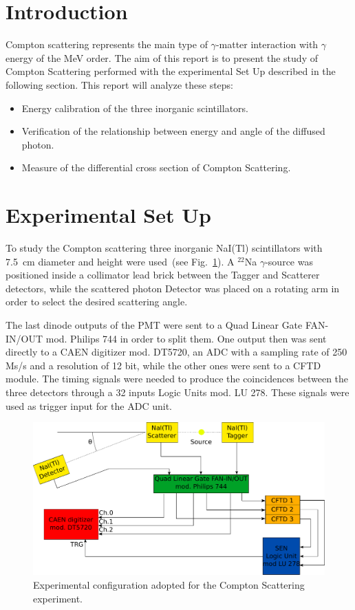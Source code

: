 \section*{Introduction}

Compton scattering represents the main  type of $\gamma$-matter interaction with $\gamma$ energy of the MeV order.   
The aim of this report is to present the study of Compton Scattering performed with the experimental Set Up described in the following section.
This report will analyze these steps:
\begin{itemize}
	\item Energy calibration of the three inorganic scintillators.
	\item Verification of the relationship between energy and angle of the diffused photon.
	\item Measure of the differential cross section of Compton Scattering.
\end{itemize}

\section*{Experimental Set Up}

To study the Compton scattering three inorganic NaI(Tl) scintillators with 7.5~cm diameter and height were used~(see Fig.~\ref{Fig:Set_up}). A $^{22}$Na $\gamma$-source was positioned inside a collimator lead brick between the Tagger and Scatterer detectors, while the scattered photon Detector was placed on a rotating arm in order to select the desired scattering angle.

The last dinode outputs of the PMT were sent to a Quad Linear Gate FAN-IN/OUT mod. Philips 744 in order to split them. One output then was sent directly to a CAEN digitizer mod. DT5720, an ADC with a sampling rate of 250 Ms/s and a resolution of 12 bit, while the other ones were sent to a  CFTD module. The timing signals were needed to produce the coincidences between the three detectors through a 32 inputs Logic Units mod. LU 278. These signals were used as trigger input for the ADC unit.

\begin{figure}[h!]
	\centering
	\includegraphics[width=\textwidth]{immagini/SetUp.pdf}
	\caption{Experimental configuration adopted for the Compton Scattering experiment.}
	\label{Fig:Set_up}
\end{figure}
